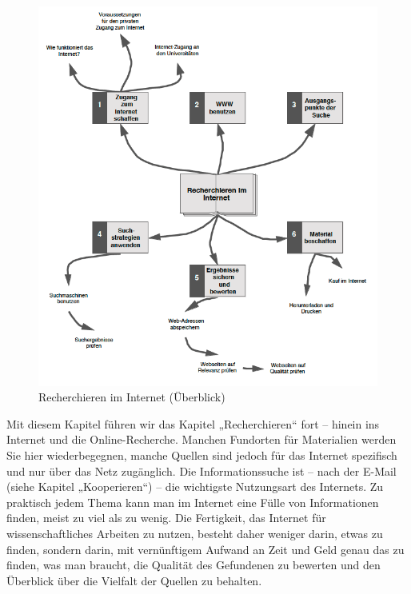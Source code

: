\documentclass[]{book}
\theoremstyle{definition}
\theoremstyle{definition}
\theoremstyle{definition}
\theoremstyle{remark}
\begin{document}
\begin{figure}

{\centering \includegraphics{images/recherchieren-internet-min} 

}

\caption{Recherchieren im Internet (Überblick)}\label{fig:unnamed-chunk-11}
\end{figure}

Mit diesem Kapitel führen wir das Kapitel „Recherchieren`` fort --
hinein ins Internet und die Online-Recherche. Manchen Fundorten für
Materialien werden Sie hier wiederbegegnen, manche Quellen sind jedoch
für das Internet spezifisch und nur über das Netz zugänglich. Die
Informationssuche ist -- nach der E-Mail (siehe Kapitel „Kooperieren``)
-- die wichtigste Nutzungsart des Internets. Zu praktisch jedem Thema
kann man im Internet eine Fülle von Informationen finden, meist zu viel
als zu wenig. Die Fertigkeit, das Internet für wissenschaftliches
Arbeiten zu nutzen, besteht daher weniger darin, etwas zu finden,
sondern darin, mit vernünftigem Aufwand an Zeit und Geld genau das zu
finden, was man braucht, die Qualität des Gefundenen zu bewerten und den
Überblick über die Vielfalt der Quellen zu behalten.
\end{document}
